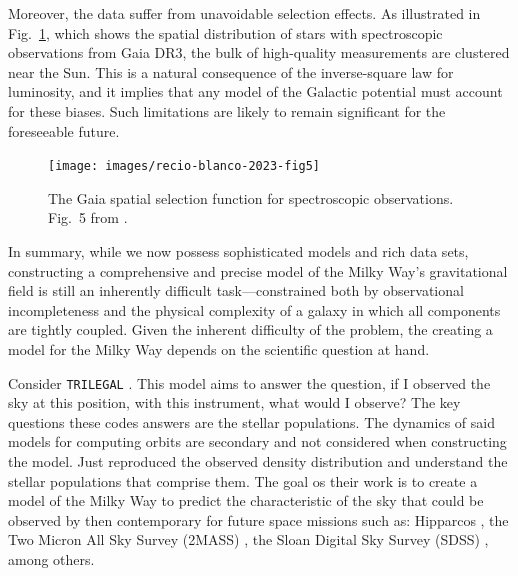         Moreover, the data suffer from unavoidable selection effects. As illustrated in Fig.~\ref{fig:gaia_selection_function}, which shows the spatial distribution of stars with spectroscopic observations from Gaia DR3, the bulk of high-quality measurements are clustered near the Sun. This is a natural consequence of the inverse-square law for luminosity, and it implies that any model of the Galactic potential must account for these biases. Such limitations are likely to remain significant for the foreseeable future.
        \begin{figure}
            \texttt{[image: images/recio-blanco-2023-fig5]}
            \caption{The Gaia spatial selection function for spectroscopic observations. Fig.~5 from \citet{2023A&A...674A..38G}.}
            \label{fig:gaia_selection_function}
        \end{figure}
        In summary, while we now possess sophisticated models and rich data sets, constructing a comprehensive and precise model of the Milky Way's gravitational field is still an inherently difficult task—constrained both by observational incompleteness and the physical complexity of a galaxy in which all components are tightly coupled. Given the inherent difficulty of the problem, the creating a model for the Milky Way depends on the scientific question at hand. 

        Consider \texttt{TRILEGAL} \citep{2005A&A...436..895G}. This model aims to answer the question, if I observed the sky at this position, with this instrument, what would I observe? The key questions these codes answers are the stellar populations. The dynamics of said models for computing orbits are secondary and not considered when constructing the model. Just reproduced the observed density distribution and understand the stellar populations that comprise them. The goal os their work is to create a model of the Milky Way to predict the characteristic of the sky that could be observed by then contemporary for future space missions such as: Hipparcos \citep{1997A&A...323L..49P}, the Two Micron All Sky Survey (2MASS) \citep{2006AJ....131.1163S}, the Sloan Digital Sky Survey (SDSS) \citep{2000AJ....120.1579Y}, among others.

